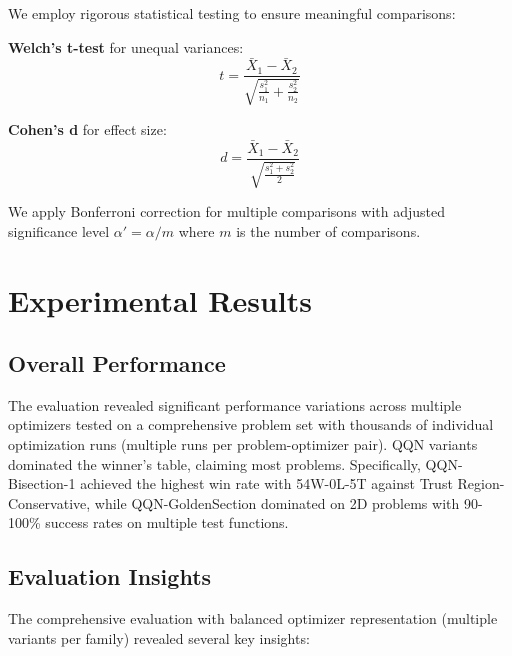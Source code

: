 We employ rigorous statistical testing to ensure meaningful comparisons:

\textbf{Welch's t-test} for unequal variances:
\[t = \frac{\bar{X}_1 - \bar{X}_2}{\sqrt{\frac{s_1^2}{n_1} + \frac{s_2^2}{n_2}}}\]

\textbf{Cohen's d} for effect size:
\[d = \frac{\bar{X}_1 - \bar{X}_2}{\sqrt{\frac{s_1^2 + s_2^2}{2}}}\]

We apply Bonferroni correction for multiple comparisons with adjusted significance level \(\alpha' = \alpha / m\) where \(m\) is the number of comparisons.

\hypertarget{experimental-results}{%
\section{Experimental Results}\label{experimental-results}}

\hypertarget{overall-performance}{%
\subsection{Overall Performance}\label{overall-performance}}

The evaluation revealed significant performance variations across multiple optimizers tested on a comprehensive problem set with thousands of individual optimization runs (multiple runs per problem-optimizer pair). QQN variants dominated the winner's table, claiming most problems. Specifically, QQN-Bisection-1 achieved the highest win rate with 54W-0L-5T against Trust Region-Conservative, while QQN-GoldenSection dominated on 2D problems with 90-100\% success rates on multiple test functions.

\hypertarget{evaluation-insights}{%
\subsection{Evaluation Insights}\label{evaluation-insights}}

The comprehensive evaluation with balanced optimizer representation (multiple variants per family) revealed several key insights:

